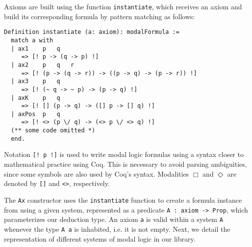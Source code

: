 \documentclass[sigconf,anonymous]{acmart}
\begin{document}
Axioms are built using the function \texttt{instantiate}, which
receives an axiom and build its corresponding formula by pattern matching as
follows:
\begin{verbatim}
Definition instantiate (a: axiom): modalFormula :=
  match a with
  | ax1    p   q
     => [! p -> (q -> p) !]
  | ax2    p   q   r
     => [! (p -> (q -> r)) -> ((p -> q) -> (p -> r)) !]
  | ax3    p   q
     => [! (~ q -> ~ p) -> (p -> q) !]
  | axK    p   q
     => [! [] (p -> q) -> ([] p -> [] q) !]
  | axPos  p   q
     => [! <> (p \/ q) -> (<> p \/ <> q) !]
  (** some code omitted *)
  end.
\end{verbatim}
Notation \texttt{[! p !]} is used to write modal logic formulas using a
syntax closer to mathematical practice using Coq. This is necessary to avoid
parsing ambiguities, since some symbols are also used by Coq's syntax.
Modalities $\Box$ and $\Diamond$ are denoted by \texttt{[]}
and \texttt{<>}, respectively.

The \texttt{Ax} constructor uses the \texttt{instantiate}
function to create a formula instance from using a given system,
represented as a predicate
\texttt{A : axiom -> Prop}, which parameterizes our deduction type. An
axiom \texttt{a} is valid within a system \texttt{A} whenever
the type \texttt{A a} is inhabited, i.e. it is not empty. Next, we
detail the representation of different systems of modal logic in our library.
\end{document}
